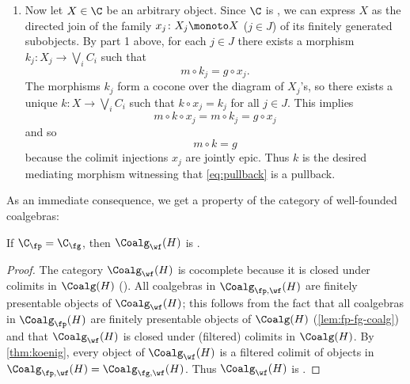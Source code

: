\documentclass[a4paper,UKenglish, autoref, numberwithinsect, final]{lipics-v2021}
\makeatletter
\numberwithin{equation}{section}
\let\oldqedhere\qedhere
\def\qedhere{\global\def\proofappendix@qedsymbolmissing{}\oldqedhere}
\newenvironment{proofhere}[2][Proof of]{%
  \proof{#1~\autoref{#2}}%
}{%
  \endproof%
  \par%
}
\newenvironment{proofappendix}[2][Proof of]{%
    \begin{proofhere}[#1]{#2}
  }{%
    \end{proofhere}
  }
\newcommand{\injmono}{\ensuremath{\overset{\smash{\raisebox{-1pt}{\ensuremath{\scriptstyle+}}}}{\rightarrowtail}}}%
\newcommand{\hpresint}{\ensuremath{H\cap}\xspace}
\theoremstyle{plain}
\theoremstyle{definition}
\makeatother
\begin{document}
\begin{proofappendix}{thm:koenig}
\begin{enumerate}
\begin{equation}
\end{equation}
Indeed, commutativity of the left-hand part is witnessed by the following diagram:
\[
\begin{tikzcd}
X  \ar{d}[swap]{g} \ar[shiftarr={yshift=7mm}]{rrr}{k} \ar{r}{\inr} & C_i+X \ar{d}{[m_i,g]} \ar{r}{e} & C_j \ar{d}{m_j} \ar{r}{n_i} & \bigvee_i C_i \ar{d}{m} \\
C \ar[equals]{r} & C \ar[equals]{r} & C \ar[equals]{r} & C 
\end{tikzcd}
\]
Then also the upper part of \eqref{eq:pb-proof} commutes because it does so when postcomposed with the monomorphism $Hm$. The uniqueness of $k$ follows from $m$ being monic.
\item Now let $X\in \C$ be an arbitrary object. Since $\C$ is \lfp, we can express $X$ as the directed join of the family $x_j\colon X_j\monoto X$ ($j\in J$) of its finitely generated subobjects. By part 1 above, for each $j\in J$ there exists a morphism $k_j\colon X_j\to \bigvee_i C_i$ such that
\[ m\circ k_j = g\circ x_j. \]
The morphisms $k_j$ form a cocone over the diagram of $X_j$'s, so there exists a unique $k\colon X\to \bigvee_i C_i$ such that $k\circ x_j = k_j$ for all $j\in J$. This implies
\[ m\circ k\circ x_j = m\circ k_j = g\circ x_j  \]
and so
\[ m\circ k = g \]
because the colimit injections $x_j$ are jointly epic. Thus $k$ is the desired mediating morphism witnessing that \eqref{eq:pullback} is a pullback.\qedhere
\end{enumerate}
\end{proofappendix}


As an immediate consequence, we get a property of the category of well-founded coalgebras:

\begin{corollary}[\smash{\injmono}, \hpresint]\label{cor:wfIsLFP}
If $\C_\fp=\C_\fg$, then $\Coalg_\wf(H)$ is \lfp. 
\end{corollary}

\begin{proof}
The category $\Coalg_\wf(H)$ is cocomplete because it is closed under colimits in $\Coalg(H)$ (). All coalgebras in $\Coalg_{\fp,\wf}(H)$ 
are finitely presentable objects of $\Coalg_\wf(H)$; this follows from the fact that all coalgebras in $\Coalg_\fp(H)$ are finitely presentable objects of $\Coalg(H)$ (\autoref{lem:fp-fg-coalg}) and that $\Coalg_\wf(H)$ is closed under (filtered) colimits in $\Coalg(H)$. By \autoref{thm:koenig}, every object of $\Coalg_\wf(H)$ is a filtered colimit of objects in $\Coalg_{\fp,\wf}(H)=\Coalg_{\fg,\wf}(H)$. Thus $\Coalg_\wf(H)$ is \lfp. 
\end{proof}
\end{document}
